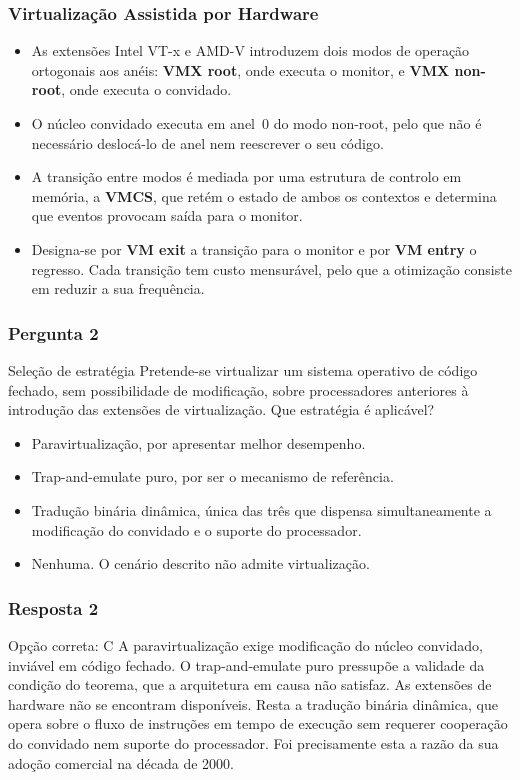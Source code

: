 \documentclass[aspectratio=169]{beamer}
\begin{document}
\begin{frame}
\frametitle{Virtualização Assistida por Hardware}
\begin{itemize}
    \setlength\itemsep{0.35cm}
    \item As extensões Intel VT-x e AMD-V introduzem dois modos de operação ortogonais aos anéis: \textbf{VMX root}, onde executa o monitor, e \textbf{VMX non-root}, onde executa o convidado.
    \item O núcleo convidado executa em anel~0 do modo non-root, pelo que não é necessário deslocá-lo de anel nem reescrever o seu código.
    \item A transição entre modos é mediada por uma estrutura de controlo em memória, a \textbf{VMCS}, que retém o estado de ambos os contextos e determina que eventos provocam saída para o monitor.
    \item Designa-se por \textbf{VM exit} a transição para o monitor e por \textbf{VM entry} o regresso. Cada transição tem custo mensurável, pelo que a otimização consiste em reduzir a sua frequência.
\end{itemize}
\end{frame}

\begin{frame}
\frametitle{Pergunta 2}
\begin{pergunta}{Seleção de estratégia}
Pretende-se virtualizar um sistema operativo de código fechado, sem possibilidade de modificação, sobre processadores anteriores à introdução das extensões de virtualização. Que estratégia é aplicável?
\begin{itemize}
    \item[A)] Paravirtualização, por apresentar melhor desempenho.
    \item[B)] Trap-and-emulate puro, por ser o mecanismo de referência.
    \item[C)] Tradução binária dinâmica, única das três que dispensa simultaneamente a modificação do convidado e o suporte do processador.
    \item[D)] Nenhuma. O cenário descrito não admite virtualização.
\end{itemize}
\end{pergunta}
\end{frame}

\begin{frame}
\frametitle{Resposta 2}
\begin{resposta}{Opção correta: C}
A paravirtualização exige modificação do núcleo convidado, inviável em código fechado. O trap-and-emulate puro pressupõe a validade da condição do teorema, que a arquitetura em causa não satisfaz. As extensões de hardware não se encontram disponíveis. Resta a tradução binária dinâmica, que opera sobre o fluxo de instruções em tempo de execução sem requerer cooperação do convidado nem suporte do processador. Foi precisamente esta a razão da sua adoção comercial na década de 2000.
\end{resposta}
\end{frame}
\end{document}
